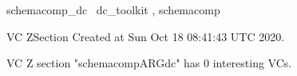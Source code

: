 \documentclass{article}
\begin{document}

\begin{zsection}	 \SECTION schemacomp\_dc \parents~dc\_toolkit , schemacomp
\end{zsection}

\newcommand{\appliesTo}{\zbinop{appliesTo}} 
\newcommand{\appliesToNofix}{\zpreop{appliesToNofix}} 

VC ZSection Created at Sun Oct 18 08:41:43 UTC 2020.



 VC Z section "schemacompARGdc" has $0$ interesting VCs.



\end{document}
